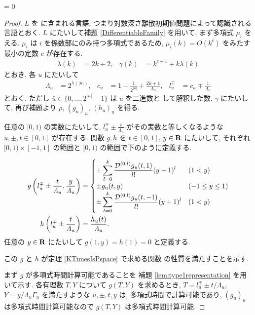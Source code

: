 \ifnum \proc = 0
\begin{proof}
 $L$ を \DIVPlog に含まれる言語,
 つまり対数深さ離散初期値問題によって認識される言語とおく.
 $L$ にたいして補題 \ref{DifferentiableFamily} を用いて,
 まず多項式 $\mu_i$ をえる.
 $\mu_i$ は $i$ を係数部にのみ持つ多項式であるため,
 $\mu_i(k) = O(k^c)$ をみたす最小の定数 $c$ が存在する.
 \begin{align}
  \lambda(k) &= 2k + 2,&
  \gamma(k) &= k^{c+1} + k \lambda(k)
 \end{align}
 とおき, 各 $u$ にたいして 
\begin{align}
 \Lambda_u 
 &= 2^{\lambda(|u|)}, &
 c_u 
 &= 1-\frac{1}{2^{|u|}}+\frac{2\bar{u}+1}{\Lambda_u}, &
 l_u^\mp 
 &= c_u\mp\frac{1}{\varLambda_u} 
\end{align}  
 とおく. ただし $\bar u \in \{0, \dots, 2^{|u|} - 1\}$ は $u$ を二進数と
 して解釈した数.
 $\gamma$ にたいして, 再び補題より $\rho$, $(g_u)_u$, $(h_u)_u$ を得る.



 任意の $[0,1)$ の実数にたいして,
 $l^\mp_u \pm \frac{t}{\Lambda_u}$ がその実数と等しくなるような
 $u, \pm, t\in [0,1]$ が存在する.
 関数 $g, h$ を $t \in [0,1]$, $y \in \mathbf R$ にたいして,
 それぞれ $[0,1) \times [-1,1]$ の範囲と $[0,1)$ の範囲で下のように定義する.



 \begin{align}
 g \left(l^\mp_u \pm \frac{t}{\varLambda_u}, \frac{y}{\varLambda_u}\right)
  &= \begin{cases}
      \pm \displaystyle \sum_{l=0}^k \frac{\mathcal D^{(0,l)}g_u(t,1)}{l!} (y-1)^l 
      &  (1<y) \\
      \pm g_u(t, y)      & (-1 \le y \le 1) \\
      \pm \displaystyle \sum_{l=0}^k \frac{\mathcal D^{(0,l)}g_u(t,-1)}{l!} (y+1)^l  
      &  (1<y) \\
    \end{cases} 
  \\
 h \left( l^\mp_u \pm \frac{t}{\varLambda_u} \right) 
  & = \frac{h_u(t)}{\varLambda_u}.
\end{align}
 任意の $y \in \mathbf R$ にたいして $g(1,y) = h(1) = 0$ と定義する.




 この $g$ と $h$ が定理 \ref{KTimesIsPspace} で求める関数
 の性質を満たすことを示す.



 
 まず $g$ が多項式時間計算可能であることを
 補題 \ref{lem:type1representation} を用いて示す.
 各有理数 $T,Y$ について $g(T, Y)$ を求めるとき,
 $T=l_u^\mp \pm t/\Lambda_u$, $Y = y/\Lambda_u\Gamma_u$ を満たすような
 $u, \pm, t, y$ は, 多項式時間で計算可能であり,
 $(g_u)_u$ は多項式時間計算可能なので $g(T, Y)$ は多項式時間計算可能.





\end{proof}
